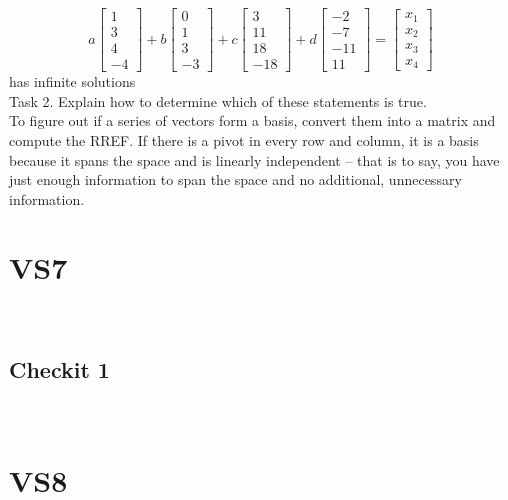 \documentclass{article}
\begin{document}
{{$$
a \left[\begin{matrix} 1 \\ 3 \\ 4 \\ -4 \end{matrix}\right] +
b \left[\begin{matrix} 0 \\ 1 \\ 3 \\ -3 \end{matrix}\right] +
c \left[\begin{matrix} 3 \\ 11 \\ 18 \\ -18 \end{matrix}\right] +
d \left[\begin{matrix}-2 \\ -7 \\ -11 \\ 11 \end{matrix}\right] = \left[\begin{matrix}x_{1} \\ x_{2} \\ x_{3} \\ x_{4} \end{matrix} \right]$$ 
has infinite solutions\\
\newpage
Task 2.
Explain how to determine which of these statements is true.\\
To figure out if a series of vectors form a basis, convert them into a matrix and compute the RREF. If there is a pivot in every row and column, it is a basis because it spans the space and is linearly independent -- that is to say, you have just enough information to span the space and no additional, unnecessary information.\\


\newpage
\section{VS7}\\
\subsection*{Checkit 1}\\

\newpage
\section{VS8}\\
}}
\end{document}
